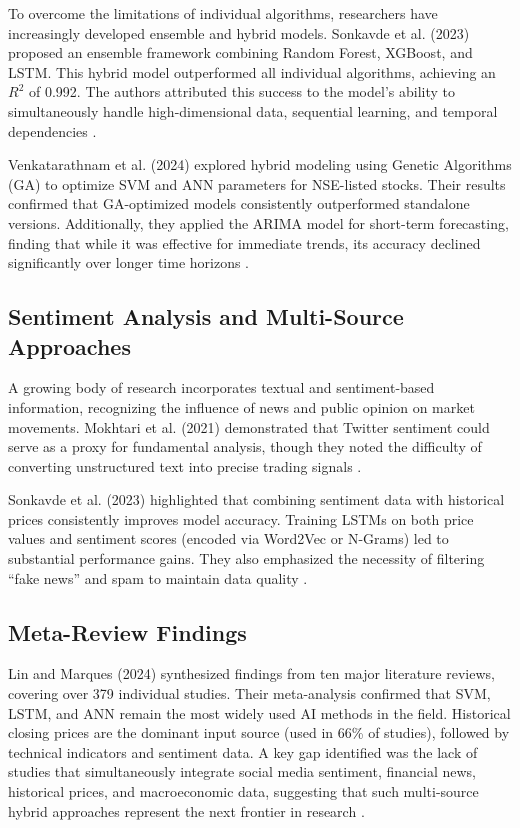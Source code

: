 \documentclass[11pt,a4paper]{article}
\begin{document}
To overcome the limitations of individual algorithms, researchers have increasingly developed
ensemble and hybrid models. Sonkavde et al. (2023) proposed an ensemble framework combining
Random Forest, XGBoost, and LSTM. This hybrid model outperformed all individual algorithms,
achieving an $R^2$ of 0.992. The authors attributed this success to the model's ability to
simultaneously handle high-dimensional data, sequential learning, and temporal dependencies
\cite{sonkavde2023}.

Venkatarathnam et al. (2024) explored hybrid modeling using Genetic Algorithms (GA) to optimize
SVM and ANN parameters for NSE-listed stocks. Their results confirmed that GA-optimized models
consistently outperformed standalone versions. Additionally, they applied the ARIMA model for
short-term forecasting, finding that while it was effective for immediate trends, its accuracy declined
significantly over longer time horizons \cite{venkatarathnam2024}.

\subsection{Sentiment Analysis and Multi-Source Approaches}

A growing body of research incorporates textual and sentiment-based information, recognizing the
influence of news and public opinion on market movements. Mokhtari et al. (2021) demonstrated that
Twitter sentiment could serve as a proxy for fundamental analysis, though they noted the difficulty of
converting unstructured text into precise trading signals \cite{mokhtari2021}.

Sonkavde et al. (2023) highlighted that combining sentiment data with historical prices consistently
improves model accuracy. Training LSTMs on both price values and sentiment scores (encoded via
Word2Vec or N-Grams) led to substantial performance gains. They also emphasized the necessity of
filtering ``fake news'' and spam to maintain data quality \cite{sonkavde2023}.

\subsection{Meta-Review Findings}

Lin and Marques (2024) synthesized findings from ten major literature reviews, covering over 379
individual studies. Their meta-analysis confirmed that SVM, LSTM, and ANN remain the most widely
used AI methods in the field. Historical closing prices are the dominant input source (used in 66\% of
studies), followed by technical indicators and sentiment data. A key gap identified was the lack of
studies that simultaneously integrate social media sentiment, financial news, historical prices, and
macroeconomic data, suggesting that such multi-source hybrid approaches represent the next frontier
in research \cite{lin2024}.
\end{document}
